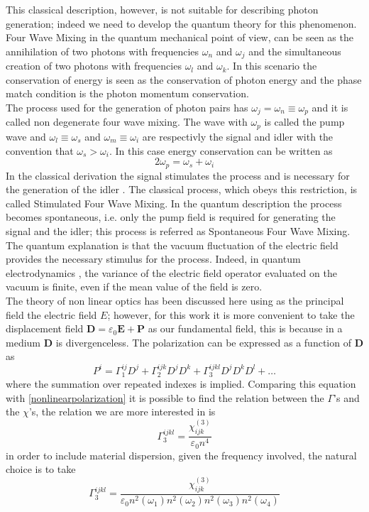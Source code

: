 \documentclass[12pt]{book}
\begin{document}
This classical description, however, is not suitable for describing photon generation; indeed we need to develop the quantum theory for this phenomenon. Four Wave Mixing in the quantum mechanical point of view, can be seen as the annihilation of two photons with frequencies $\omega_n$ and $\omega_j$ and the simultaneous creation of two photons with frequencies $\omega_l$ and $\omega_k$. In this scenario the conservation of energy is seen as the conservation of photon energy and the phase match condition is the photon momentum conservation.\\
The process used for the generation of photon pairs has $\omega_j = \omega_n \equiv \omega_p$ and it is called non degenerate four wave mixing. The wave with $\omega_p$ is called the pump wave and $\omega_l\equiv \omega_s$ and $\omega_m \equiv \omega_i$ are respectivly the signal and idler with the convention that $\omega_s > \omega_i$. In this case energy conservation can be written as
\begin{equation}\label{conservationenergy}2\omega_p = \omega_s + \omega_i\end{equation}
In the classical derivation the signal stimulates the process and is necessary for the generation of the idler \cite{phdthesis:borghi}. The classical process, which obeys this restriction, is called Stimulated Four Wave Mixing. In the quantum description the process becomes spontaneous, i.e. only the pump field is required for generating the signal and the idler; this process is referred as Spontaneous Four Wave Mixing. The quantum explanation is that the vacuum fluctuation of the electric field provides the necessary stimulus for the process. Indeed, in quantum electrodynamics \cite{book:cohen}, the variance of the electric field operator evaluated on the vacuum is finite, even if the mean value of the field is zero.\\
The theory of non linear optics has been discussed here using as the principal field the electric field $E$; however, for this work it is more convenient to take the displacement field $\mathbf{D} = \varepsilon_0\mathbf{E} +\mathbf{P} $ as our fundamental field, this is because in a medium $\mathbf{D}$ is divergenceless. The polarization can be expressed as a function of $\mathbf{D}$ as
\begin{equation}P^i = \Gamma^{ij}_1D^j +\Gamma_2^{ijk}D^jD^k + \Gamma_3^{ijkl}D^jD^kD^l + \dots\end{equation}
where the summation over repeated indexes is implied. Comparing this equation with \eqref{nonlinearpolarization} it is possible to find the relation between the $\Gamma$'s and the $\chi$'s, the relation we are more interested in is
\begin{equation}\Gamma_3^{ijkl} = \frac{\chi_{ijk}^{(3)}}{\varepsilon_0 n^4}\end{equation}
in order to include material dispersion, given the frequency involved, the natural choice is to take
\begin{equation}\Gamma_3^{ijkl} = \frac{\chi_{ijk}^{(3)}}{\varepsilon_0 n^2(\omega_1)n^2(\omega_2)n^2(\omega_3)n^2(\omega_4)}\end{equation}
\end{document}
